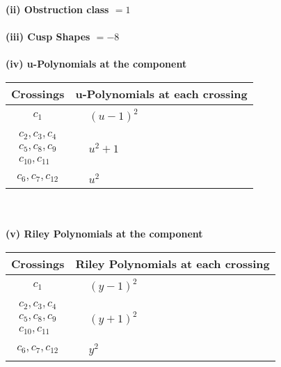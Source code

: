 \documentclass[1p]{elsarticle_modified}
\theoremstyle{definition}
\begin{document}
\flushleft \textbf{(ii) Obstruction class $= 1$}\\~\\
\flushleft \textbf{(iii) Cusp Shapes $= -8$}\\~\\
\newpage\renewcommand{\arraystretch}{1}
\flushleft \textbf{(iv) u-Polynomials at the component}\newline \\
\begin{tabular}{m{50pt}|m{274pt}}
Crossings & \hspace{64pt}u-Polynomials at each crossing \\
\hline $$\begin{aligned}c_{1}\end{aligned}$$&$\begin{aligned}
&(u-1)^2
\end{aligned}$\\
\hline $$\begin{aligned}c_{2},c_{3},c_{4}\\c_{5},c_{8},c_{9}\\c_{10},c_{11}\end{aligned}$$&$\begin{aligned}
&u^2+1
\end{aligned}$\\
\hline $$\begin{aligned}c_{6},c_{7},c_{12}\end{aligned}$$&$\begin{aligned}
&u^2
\end{aligned}$\\
\hline
\end{tabular}\\~\\
\newpage\renewcommand{\arraystretch}{1}
\flushleft \textbf{(v) Riley Polynomials at the component}\newline \\
\begin{tabular}{m{50pt}|m{274pt}}
Crossings & \hspace{64pt}Riley Polynomials at each crossing \\
\hline $$\begin{aligned}c_{1}\end{aligned}$$&$\begin{aligned}
&(y-1)^2
\end{aligned}$\\
\hline $$\begin{aligned}c_{2},c_{3},c_{4}\\c_{5},c_{8},c_{9}\\c_{10},c_{11}\end{aligned}$$&$\begin{aligned}
&(y+1)^2
\end{aligned}$\\
\hline $$\begin{aligned}c_{6},c_{7},c_{12}\end{aligned}$$&$\begin{aligned}
&y^2
\end{aligned}$\\
\hline
\end{tabular}\\~\\
\end{document}

